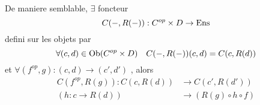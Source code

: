\documentclass[../main.tex]{subfiles}
\begin{document}
De maniere semblable, $\exists$ foncteur
\[ 
	C( -, R( -) ) : C^{op}\times D \to \operatorname{Ens}
\]
defini sur les objets par
\[ 
	\forall ( c,d) \in \operatorname{Ob} ( C^{op}\times D) \quad C( -, R( -) ) ( c,d) = C( c,R( d) ) 
\]
et $\forall ( f^{op},g) :( c,d) \to ( c',d')  $ , alors
\begin{align*}
	C( f^{op},R( g) ) : C( c,R( d) ) &\to C( c', R( d') ) \\
	( h: c\to R( d) ) &\to ( R( g) \circ h \circ f ) 
\end{align*}



			



			
\end{document}
